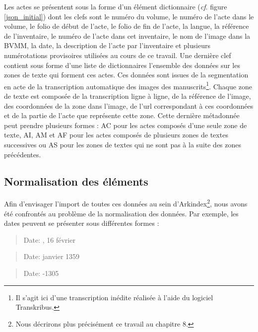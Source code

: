 \documentclass[a4paper,12pt,twoside]{book}
\begin{document}
	Les actes se présentent sous la forme d'un élément dictionnaire (\textit{cf}. figure \ref{json_initial}) dont les clefs sont le numéro du volume, le numéro de l'acte dans le volume, le folio de début de l'acte, le folio de fin de l'acte, la langue, la référence de l'inventaire, le numéro de l'acte dans cet inventaire, le nom de l'image dans la BVMM, la date, la description de l'acte par l'inventaire et plusieurs numérotations provisoires utilisées au cours de ce travail. Une dernière clef contient sous forme d'une liste de dictionnaires l'ensemble des données sur les zones de texte qui forment ces actes. Ces données sont issues de la segmentation en acte de la transcription automatique des images des manuscrits\footnote{Il s'agit ici d'une transcription inédite réalisée à l'aide du logiciel Transkribus.}. Chaque zone de texte est composée de la transcription ligne à ligne, de la référence de l'image, des coordonnées de la zone dans l'image, de l'url correspondant à ces coordonnées et de la partie de l'acte que représente cette zone. Cette dernière métadonnée peut prendre plusieurs formes : \og AC\fg{} pour les actes composés d'une seule zone de texte, \og AI\fg{}, \og AM\fg{} et \og AF\fg{} pour les actes composés de plusieurs zones de textes successives ou \og AS\fg{} pour les zones de textes qui ne sont pas à la suite des zones précédentes.
	
	\subsection{Normalisation des éléments}
	
	Afin d'envisager l'import de toutes ces données au sein d'Arkindex\footnote{Nous décrirons plus précisément ce travail au chapitre 8.}, nous avons été confrontés au problème de la normalisation des données. Par exemple, les dates peuvent se présenter sous différentes formes :
	
	\begin{quotation}
		\textquotesingle Date\textquotesingle : , 16 février\textquotesingle 
	\end{quotation}
	
	\begin{quotation}
		\textquotesingle Date\textquotesingle :  janvier 1359\textquotesingle
	\end{quotation}

	\begin{quotation}
		\textquotesingle Date\textquotesingle : -1305\textquotesingle
	\end{quotation}
	
\end{document}
